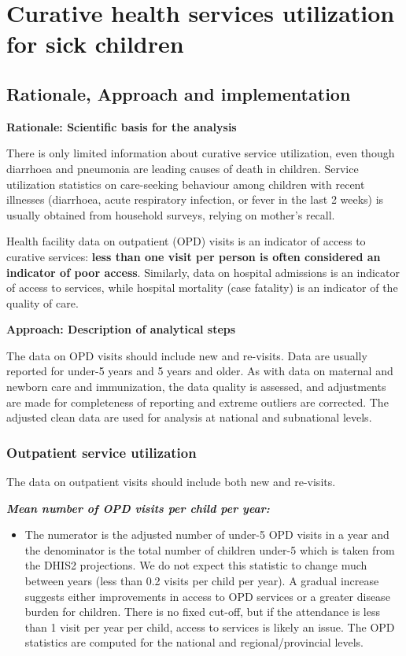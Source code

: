 \documentclass[
  english,
  letterpaper,
  DIV=11,
  numbers=noendperiod]{scrreprt}
\providecommand{\tightlist}{%
  \setlength{\itemsep}{0pt}\setlength{\parskip}{0pt}}
\begin{document}
\chapter{Curative health services utilization for sick
children}\label{curative-health-services-utilization-for-sick-children}

\section{Rationale, Approach and
implementation}\label{rationale-approach-and-implementation-7}

\textbf{Rationale: Scientific basis for the analysis}

There is only limited information about curative service utilization,
even though diarrhoea and pneumonia are leading causes of death in
children. Service utilization statistics on care-seeking behaviour among
children with recent illnesses (diarrhoea, acute respiratory infection,
or fever in the last 2 weeks) is usually obtained from household
surveys, relying on mother's recall.

Health facility data on outpatient (OPD) visits is an indicator of
access to curative services: \textbf{less than one visit per person is
often considered an indicator of poor access}. Similarly, data on
hospital admissions is an indicator of access to services, while
hospital mortality (case fatality) is an indicator of the quality of
care.

\textbf{Approach: Description of analytical steps}

The data on OPD visits should include new and re-visits. Data are
usually reported for under-5 years and 5 years and older. As with data
on maternal and newborn care and immunization, the data quality is
assessed, and adjustments are made for completeness of reporting and
extreme outliers are corrected. The adjusted clean data are used for
analysis at national and subnational levels.

\subsection{Outpatient service
utilization}\label{outpatient-service-utilization}

The data on outpatient visits should include both new and re-visits.

\textbf{\emph{Mean number of OPD visits per child per year:}}

\begin{itemize}
\tightlist
\item
  The numerator is the adjusted number of under-5 OPD visits in a year
  and the denominator is the total number of children under-5 which is
  taken from the DHIS2 projections. We do not expect this statistic to
  change much between years (less than 0.2 visits per child per year). A
  gradual increase suggests either improvements in access to OPD
  services or a greater disease burden for children. There is no fixed
  cut-off, but if the attendance is less than 1 visit per year per
  child, access to services is likely an issue. The OPD statistics are
  computed for the national and regional/provincial levels.
\end{itemize}
\end{document}
